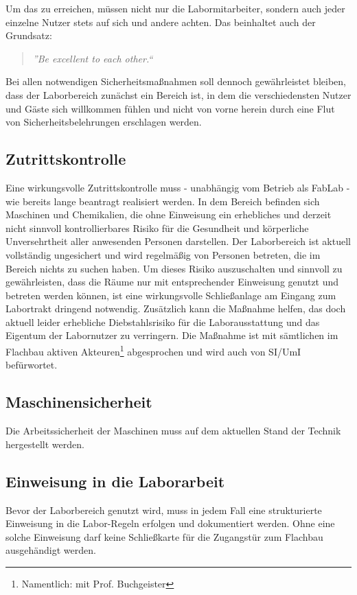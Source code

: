 \documentclass[parskip=half,headsepline,footsepline,titlepage]{scrartcl}
\begin{document}
Um das zu erreichen, müssen nicht nur die Labormitarbeiter, sondern auch jeder einzelne Nutzer stets auf sich und andere achten. Das beinhaltet auch der Grundsatz:
\begin{quote}\emph{''Be excellent to each other.``}\end{quote}


Bei allen notwendigen Sicherheitsmaßnahmen soll dennoch gewährleistet bleiben, dass der Laborbereich zunächst ein Bereich ist, in dem die verschiedensten Nutzer und Gäste sich willkommen fühlen und nicht von vorne herein durch eine Flut von Sicherheitsbelehrungen erschlagen werden.

\subsection{Zutrittskontrolle}
Eine wirkungsvolle Zutrittskontrolle muss - unabhängig vom Betrieb als FabLab - wie bereits lange beantragt realisiert werden. In dem Bereich befinden sich Maschinen und Chemikalien, die ohne Einweisung ein erhebliches und derzeit nicht sinnvoll kontrollierbares Risiko für die Gesundheit und körperliche Unversehrtheit aller anwesenden Personen darstellen. Der Laborbereich ist aktuell vollständig ungesichert und wird regelmäßig von Personen betreten, die im Bereich nichts zu suchen haben. Um dieses Risiko auszuschalten und sinnvoll zu gewährleisten, dass die Räume nur mit entsprechender Einweisung genutzt und betreten werden können, ist eine wirkungsvolle Schließanlage am Eingang zum Labortrakt dringend notwendig. Zusätzlich kann die Maßnahme helfen, das doch aktuell leider erhebliche Diebstahlsrisiko für die Laborausstattung und das Eigentum der Labornutzer zu verringern. Die Maßnahme ist mit sämtlichen im Flachbau aktiven Akteuren\footnote{Namentlich: mit Prof. Buchgeister} abgesprochen und wird auch von SI/UmI befürwortet.

\subsection{Maschinensicherheit}
Die Arbeitssicherheit der Maschinen muss auf dem aktuellen Stand der Technik hergestellt werden.

\subsection{Einweisung in die Laborarbeit}
Bevor der Laborbereich genutzt wird, muss in jedem Fall eine strukturierte Einweisung in die Labor-Regeln erfolgen und dokumentiert werden. Ohne eine solche Einweisung darf keine Schließkarte für die  Zugangstür zum Flachbau ausgehändigt werden.
\end{document}
